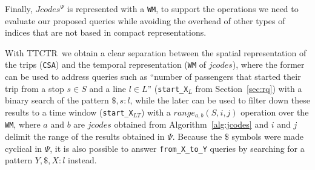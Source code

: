 \documentclass[runningheads]{llncs}
\newcommand{\ttctr}{TTCTR}
\begin{document}


Finally, $Jcodes^{\Psi}$ is represented with a \texttt{WM}, to support the operations we need to evaluate our proposed queries while avoiding the overhead of other types of indices that are not based in compact representations.

With \ttctr~we obtain a clear separation between the spatial representation of the trips (\texttt{CSA}) and the temporal representation (\texttt{WM} of $jcodes$), where the former can be used to address queries such as ``number of passengers that started their trip from a stop $s\in S$ and a line $l\in L$'' (\texttt{start\_X$_{L}$} from Section~\ref{sec:rq}) with a binary search of the pattern $\$,s:l$, while the later can be used to filter down these results to a time window (\texttt{start\_X$_{LT}$}) with a $range_{a,b}(S,i,j)$ operation over the \texttt{WM}, where $a$ and $b$ are $jcodes$ obtained from Algorithm~\ref{alg:jcodes} and $i$ and $j$ delimit the range of the results obtained in $\Psi$. Because the $\$$ symbols were made cyclical in $\Psi$, it is also possible to answer \texttt{from\_X\_to\_Y} queries by searching for a pattern $Y,\$,X:l$ instead.
\end{document}
